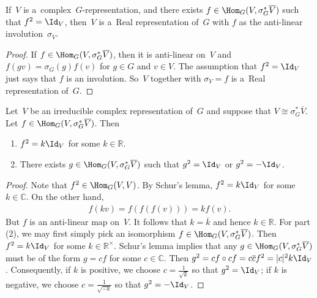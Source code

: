 \begin{Proposition}
If~$V$ is a~complex~$G$-representation, and there exists $f\in\Hom_G(V,\sigma_G^*\overline{V})$
such that $f^2=\Id_V$, then~$V$ is a~Real representation of~$G$ with $f$ as the anti-linear involution~$\sigma_V$.
\end{Proposition}
\begin{proof}
If $f\in\Hom_G(V,
\sigma_G^*\overline{V})$, then it is anti-linear on~$V$ and $f(gv)=
\sigma_G(g)f(v)$ for $g\in G$ and $v\in V$.
The assumption that $f^2=\Id
_V$ just says that $f$ is an involution.
So~$V$ together with $\sigma_V=f$ is a~Real representation of~$G$.
\end{proof}
\begin{Proposition}
Let~$V$ be an irreducible complex representation of~$G$ and suppose that $V\cong
\sigma_G^*\overline{V}$.
Let $f\in\Hom_G(V,
\sigma_G^*\overline{V})$.
Then
\begin{enumerate}\itemsep=0pt
\item[$1.$]
$f^2=k\Id_V$ for some $k\in\mathbb{R}$.
\item[$2.$]
There exists $g\in\Hom_G(V,
\sigma_G^*\overline{V})$ such that $g^2=\Id_V$ or $g^2=-\Id_V$.
\end{enumerate}
\end{Proposition}
\begin{proof}
Note that $f^2\in\Hom_G(V, V)$.
By Schur's lemma, $f^2=k\Id_V$ for some $k\in\mathbb{C}$.
On the other hand,
\begin{gather*}
f(kv)=f(f(f(v)))=kf(v).
\end{gather*}
But $f$ is an anti-linear map on~$V$.
It follows that $k=\overline{k}$ and hence $k\in\mathbb{R}$.
For part (2), we may f\/irst simply pick an isomorphism $f\in\Hom_G(V,
\sigma_G^*\overline{V})$.
Then $f^2=k\Id_V$ for some $k\in\mathbb{R}^\times$.
Schur's lemma implies that any $g\in\Hom_G(V,
\sigma_G^*\overline{V})$ must be of the form $g=cf$ for some $c\in\mathbb{C}$.
Then $g^2=cf\circ cf=c\overline{c}f^2=|c|^2k\Id_V$.
Consequently, if $k$ is positive, we choose $c=\frac{1}{\sqrt{k}}$ so that $g^2=\Id_V$; if $k$ is negative, we choose $c=\frac{1}{\sqrt{-k}}$ so that $g^2=-\Id_V$.
\end{proof}

